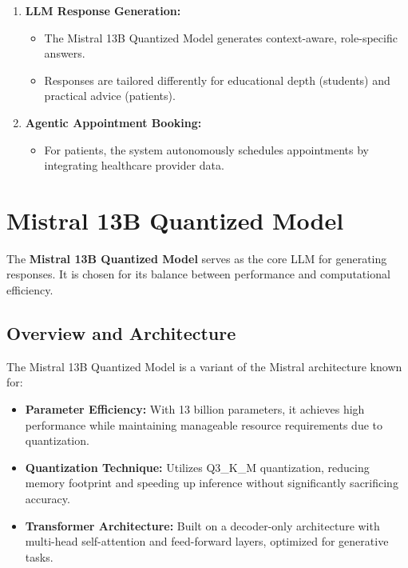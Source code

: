 \begin{enumerate}
  \item \textbf{LLM Response Generation:}
    \begin{itemize}
        \item The Mistral 13B Quantized Model generates context-aware, role-specific answers.
        \item Responses are tailored differently for educational depth (students) and practical advice (patients).
    \end{itemize}
  \item \textbf{Agentic Appointment Booking:}
    \begin{itemize}
        \item For patients, the system autonomously schedules appointments by integrating healthcare provider data.
    \end{itemize}
\end{enumerate}

\section{Mistral 13B Quantized Model}
\label{sec:mistral_model}

The \textbf{Mistral 13B Quantized Model} serves as the core LLM for generating responses. It is chosen for its balance between performance and computational efficiency.

\subsection{Overview and Architecture}
\label{subsec:mistral_overview}
The Mistral 13B Quantized Model is a variant of the Mistral architecture known for:
\begin{itemize}
    \item \textbf{Parameter Efficiency:} With 13 billion parameters, it achieves high performance while maintaining manageable resource requirements due to quantization.
    \item \textbf{Quantization Technique:} Utilizes Q3\_K\_M quantization, reducing memory footprint and speeding up inference without significantly sacrificing accuracy.
    \item \textbf{Transformer Architecture:} Built on a decoder-only architecture with multi-head self-attention and feed-forward layers, optimized for generative tasks.
\end{itemize}

